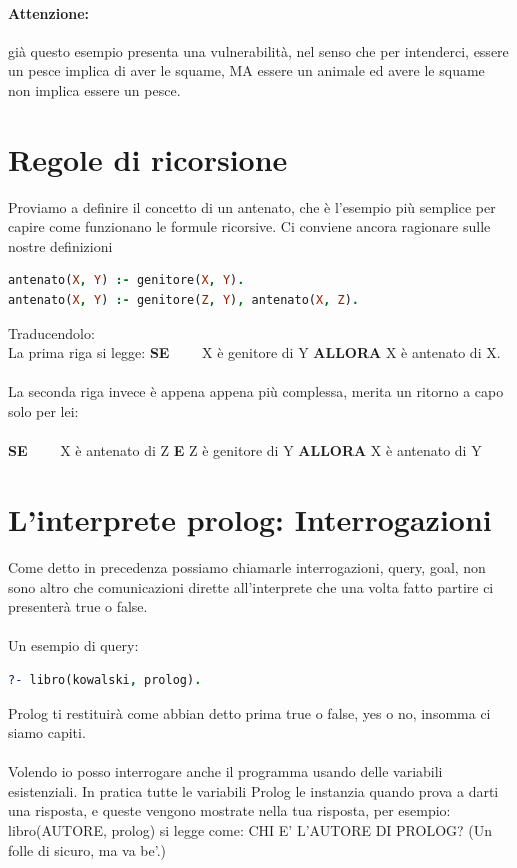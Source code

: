\documentclass[12pt, a4paper, openany, oneside]{book}
\begin{document}
{\paragraph{Attenzione: } già questo esempio presenta una vulnerabilità, nel senso
che per intenderci, essere un pesce implica di aver le squame, MA essere un 
animale ed avere le squame non implica essere un pesce.
\section{Regole di ricorsione}
Proviamo a definire il concetto di un antenato, che è l'esempio più semplice 
per capire come funzionano le formule ricorsive. Ci conviene ancora ragionare 
sulle nostre definizioni
\begin{lstlisting}[language = Prolog]
antenato(X, Y) :- genitore(X, Y).
antenato(X, Y) :- genitore(Z, Y), antenato(X, Z).
\end{lstlisting}
Traducendolo: \\
La prima riga si legge: \textbf{SE}~~~~ X è \color{red}genitore \color{black} di Y
\textbf{ALLORA} X è \color{red}antenato \color{black} di X. \\ \\
La seconda riga invece è appena appena più complessa, merita un ritorno a capo 
solo per lei: \\ \\
\textbf{SE}~~~~ X è \color{red}antenato \color{black} di Z \textbf{E} Z 
è \color{red}genitore \color{black} di Y \textbf{ALLORA} X è \color{red}antenato
\color{black} di Y
\section{L'interprete prolog: Interrogazioni}
Come detto in precedenza possiamo chiamarle interrogazioni, query, goal, non sono
altro che comunicazioni dirette all'interprete che una volta fatto partire ci 
presenterà true o false. \\ \\
Un esempio di query:\\ 
\begin{lstlisting}[language = Prolog]
?- libro(kowalski, prolog).
\end{lstlisting}
Prolog ti restituirà come abbian detto prima true o false, yes o no, insomma ci
siamo capiti.
\\ \\
Volendo io posso interrogare anche il programma usando delle variabili esistenziali.
In pratica tutte le variabili Prolog le instanzia quando prova a darti una risposta,
e queste vengono mostrate nella tua risposta, per esempio:\\
libro(AUTORE, prolog) si legge come: CHI E' L'AUTORE DI PROLOG? 
(Un folle di sicuro, ma va be'.) \\ \\
}
\end{document}
